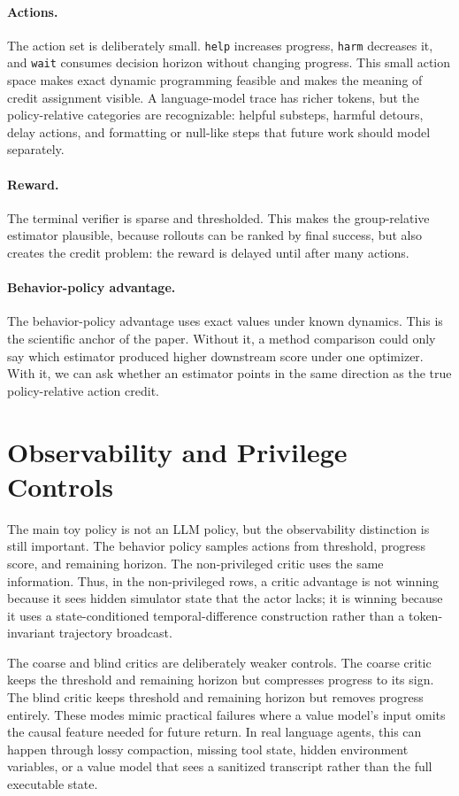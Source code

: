 \documentclass[11pt]{article}
\begin{document}
\paragraph{Actions.}
The action set is deliberately small. \texttt{help} increases progress,
\texttt{harm} decreases it, and \texttt{wait} consumes decision horizon without
changing progress. This small action space makes exact dynamic programming
feasible and makes the meaning of credit assignment visible. A language-model
trace has richer tokens, but the policy-relative categories are recognizable:
helpful substeps, harmful detours, delay actions, and formatting or null-like
steps that future work should model separately.

\paragraph{Reward.}
The terminal verifier is sparse and thresholded. This makes the group-relative
estimator plausible, because rollouts can be ranked by final success, but also
creates the credit problem: the reward is delayed until after many actions.

\paragraph{Behavior-policy advantage.}
The behavior-policy advantage uses exact values under known dynamics. This is the
scientific anchor of the paper. Without it, a method comparison could only say
which estimator produced higher downstream score under one optimizer. With it,
we can ask whether an estimator points in the same direction as the true
policy-relative action credit.

\section{Observability and Privilege Controls}

The main toy policy is not an LLM policy, but the observability distinction is
still important. The behavior policy samples actions from threshold, progress
score, and remaining horizon. The non-privileged critic uses the same
information. Thus, in the non-privileged rows, a critic advantage is not
winning because it sees hidden simulator state that the actor lacks; it is
winning because it uses a state-conditioned temporal-difference construction
rather than a token-invariant trajectory broadcast.

The coarse and blind critics are deliberately weaker controls. The coarse
critic keeps the threshold and remaining horizon but compresses progress to
its sign. The blind critic keeps threshold and remaining horizon but removes
progress entirely. These modes mimic practical failures where a value model's
input omits the causal feature needed for future return. In real language
agents, this can happen through lossy compaction, missing tool state, hidden
environment variables, or a value model that sees a sanitized transcript rather
than the full executable state.
\end{document}

